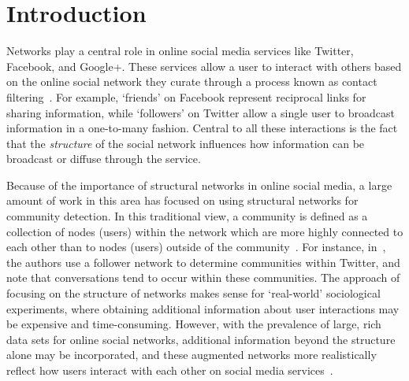 \section{Introduction}

Networks play a central role in online social media services like Twitter, Facebook, and Google+. These services allow a user to interact with others based on the online social network they curate through a process known as contact filtering~\cite{cazabet2012automated}. For example, `friends' on Facebook represent reciprocal links for sharing information, while `followers' on Twitter allow a single user to broadcast information in a one-to-many fashion. Central to all these interactions is the fact that the \emph{structure} of the social network influences how information can be broadcast or diffuse through the service.

Because of the importance of structural networks in online social media, a large amount of work in this area has focused on using structural networks for community detection. In this traditional view, a community is defined as a collection of nodes (users) within the network which are more highly connected to each other than to nodes (users) outside of the community~\cite{girvan2002a, newman2004finding}. For instance, in~\cite{java2009we}, the authors use a follower network to determine communities within Twitter, and note that conversations tend to occur within these communities. The approach of focusing on the structure of networks makes sense for `real-world' sociological experiments, where obtaining additional information about user interactions may be expensive and time-consuming. However, with the prevalence of large, rich data sets for online social networks, additional information beyond the structure alone may be incorporated, and these augmented networks more realistically reflect how users interact with each other on social media services~\cite{nguyen2011adaptive,grabowicz2012social}.

